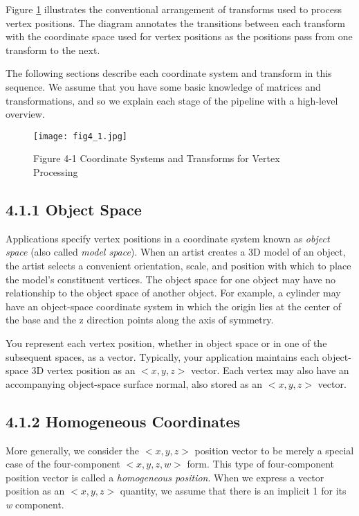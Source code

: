 \documentclass[../main.tex]{subfiles}
\begin{document}
Figure \ref{fig:4-1} illustrates the conventional arrangement of transforms used to process vertex positions. The diagram annotates the transitions between each transform with the coordinate space used for vertex positions as the positions pass from one transform to the next.

The following sections describe each coordinate system and transform in this sequence. We assume that you have some basic knowledge of matrices and transformations, and so we explain each stage of the pipeline with a high-level overview.

\begin{figure}
    \centering
    \texttt{[image: fig4\_1.jpg]}
    \caption{Figure 4-1 Coordinate Systems and Transforms for Vertex Processing}
    \label{fig:4-1}
\end{figure}

\subsection{4.1.1 Object Space}

Applications specify vertex positions in a coordinate system known as \textit{object space} (also called \textit{model space}). When an artist creates a 3D model of an object, the artist selects a convenient orientation, scale, and position with which to place the model's constituent vertices. The object space for one object may have no relationship to the object space of another object. For example, a cylinder may have an object-space coordinate system in which the origin lies at the center of the base and the z direction points along the axis of symmetry.

You represent each vertex position, whether in object space or in one of the subsequent spaces, as a vector. Typically, your application maintains each object-space 3D vertex position as an $<x, y, z>$ vector. Each vertex may also have an accompanying object-space surface normal, also stored as an $<x, y, z>$ vector.

\subsection{4.1.2 Homogeneous Coordinates}

More generally, we consider the $<x, y, z>$ position vector to be merely a special case of the four-component $<x, y, z, w>$ form. This type of four-component position vector is called a \textit{homogeneous position}. When we express a vector position as an $<x, y, z>$ quantity, we assume that there is an implicit 1 for its \textit{w} component.
\end{document}
